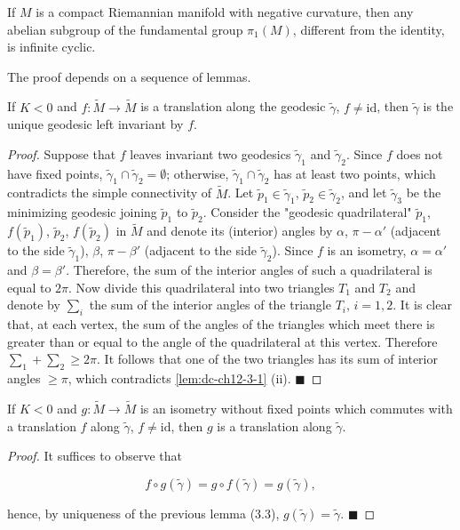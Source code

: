 \begin{theorem}[Preissman]
  \label{thm:dc-ch12-3-2}
  If $M$ is a compact Riemannian manifold with negative curvature, then any abelian
  subgroup of the fundamental group $\pi_1(M)$, different from the identity, is
  infinite cyclic.
  
  The proof depends on a sequence of lemmas.
\end{theorem}

\begin{lemma}
  \label{lem:dc-ch12-3-3}
  If $K<0$ and $f:\tilde{M}\to\tilde{M}$ is a translation along the geodesic
  $\tilde{\gamma}$, $f\neq\mathrm{id}$, then $\tilde{\gamma}$ is the unique geodesic
  left invariant by $f$.
\end{lemma}
\begin{proof}
  Suppose that $f$ leaves invariant two geodesics $\tilde{\gamma}_1$ and
  $\tilde{\gamma}_2$. Since $f$ does not have fixed points,
  $\tilde{\gamma}_1\cap\tilde{\gamma}_2=\emptyset$; otherwise,
  $\tilde{\gamma}_1\cap\tilde{\gamma}_2$ has at least two points, which contradicts
  the simple connectivity of $\tilde{M}$. Let $\tilde{p}_1\in\tilde{\gamma}_1$,
  $\tilde{p}_2\in\tilde{\gamma}_2$, and let $\tilde{\gamma}_3$ be the minimizing
  geodesic joining $\tilde{p}_1$ to $\tilde{p}_2$. Consider the "geodesic
  quadrilateral" $\tilde{p}_1$, $f(\tilde{p}_1)$, $\tilde{p}_2$, $f(\tilde{p}_2)$ in
  $\tilde{M}$ and denote its (interior) angles by $\alpha$, $\pi-\alpha'$ (adjacent
  to the side $\tilde{\gamma}_1$), $\beta$, $\pi-\beta'$ (adjacent to the side
  $\tilde{\gamma}_2$). Since $f$ is an isometry, $\alpha=\alpha'$ and $\beta=\beta'$.
  Therefore, the sum of the interior angles of such a quadrilateral is equal to
  $2\pi$. Now divide this quadrilateral into two triangles $T_1$ and $T_2$ and
  denote by $\sum_i$ the sum of the interior angles of the triangle $T_i$,
  $i=1,2$. It is clear that, at each vertex, the sum of the angles of the triangles
  which meet there is greater than or equal to the angle of the quadrilateral at
  this vertex. Therefore $\sum_1+\sum_2\geq 2\pi$. It follows that one of the two
  triangles has its sum of interior angles $\geq\pi$, which contradicts \cref{lem:dc-ch12-3-1}
  (ii). $\blacksquare$
\end{proof}

\begin{lemma}
  \label{lem:dc-ch12-3-4}
  If $K<0$ and $g:\tilde{M}\to\tilde{M}$ is an isometry without fixed points which
  commutes with a translation $f$ along $\tilde{\gamma}$, $f\neq\mathrm{id}$, then
  $g$ is a translation along $\tilde{\gamma}$.
\end{lemma}
\begin{proof}
  It suffices to observe that
  
  $$
  f\circ g(\tilde{\gamma})=g\circ f(\tilde{\gamma})=g(\tilde{\gamma}),
  $$
  
  hence, by uniqueness of the previous lemma (3.3), $g(\tilde{\gamma})=\tilde{\gamma}$.
  $\blacksquare$
\end{proof}


